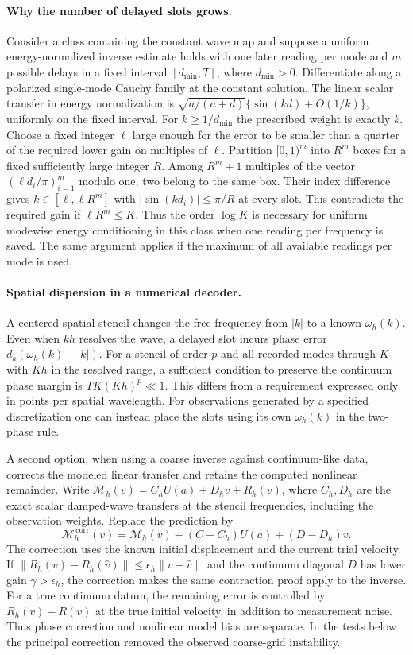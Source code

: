 \paragraph{Why the number of delayed slots grows.}
Consider a class containing the constant wave map and
suppose a uniform energy-normalized inverse estimate
holds with one later reading per mode and $m$ possible
delays in a fixed interval $[d_{\min},T]$, where
$d_{\min}>0$. Differentiate along a polarized single-mode
Cauchy family at the constant solution. The linear scalar
transfer in energy normalization is
$\sqrt{a/(a+d)}\{\sin(kd)+O(1/k)\}$,
uniformly on the fixed interval. For $k\ge 1/d_{\min}$
the prescribed weight is exactly $k$.
Choose a fixed integer $\ell$ large enough for the error
to be smaller than a quarter of the required lower gain
on multiples of $\ell$. Partition $[0,1)^m$ into
$R^m$ boxes for a fixed sufficiently large integer $R$.
Among $R^m+1$ multiples of the vector
$(\ell d_i/\pi)_{i=1}^m$ modulo one, two
belong to the same box. Their index difference gives
$k\in[\ell,\ell R^m]$ with $|\sin(kd_i)|\le\pi/R$
at every slot. This contradicts the required gain if
$\ell R^m\le K$. Thus the order $\log K$ is necessary
for uniform modewise energy conditioning in this class
when one reading per frequency is saved. The same
argument applies if the maximum of all available
readings per mode is used.

\paragraph{Spatial dispersion in a numerical decoder.}
A centered spatial stencil changes the free frequency
from $|k|$ to a known $\omega_h(k)$.
Even when $kh$ resolves the wave, a delayed slot incurs
phase error $d_k(\omega_h(k)-|k|)$.
For a stencil of order $p$ and all recorded modes
through $K$ with $Kh$ in the resolved range, a
sufficient condition to preserve the continuum phase
margin is $T K(Kh)^p\ll1$.
This differs from a requirement expressed only in
points per spatial wavelength.
For observations generated by a specified discretization
one can instead place the slots using its own
$\omega_h(k)$ in the two-phase rule.

A second option, when using a coarse inverse against
continuum-like data, corrects the modeled linear
transfer and retains the computed nonlinear remainder.
Write $\mathcal M_h(v)=C_h U(a)+D_h v+R_h(v)$,
where $C_h,D_h$ are the exact scalar damped-wave
transfers at the stencil frequencies, including the
observation weights. Replace the prediction by
\[
 \mathcal M_h^{\,\mathrm{corr}}(v)
    =\mathcal M_h(v)+(C-C_h)U(a)+(D-D_h)v .
\]
The correction uses the known initial displacement
and the current trial velocity.
If $\|R_h(v)-R_h(\widehat v)\|\le\epsilon_h\|v-\widehat v\|$
and the continuum diagonal $D$ has lower gain
$\gamma>\epsilon_h$, the correction makes the same
contraction proof apply to the inverse.
For a true continuum datum, the remaining error is
controlled by $R_h(v)-R(v)$ at the true initial
velocity, in addition to measurement noise.
Thus phase correction and nonlinear model bias are
separate. In the tests below the principal correction
removed the observed coarse-grid instability.

